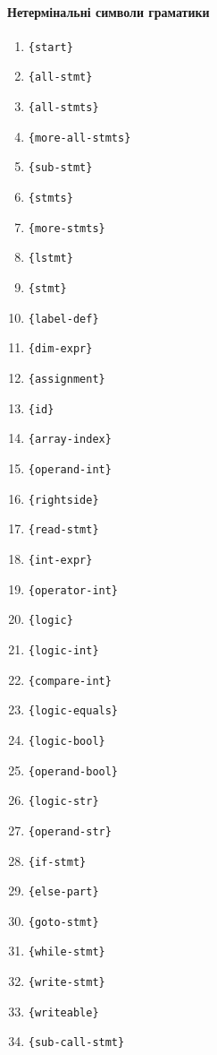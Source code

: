 \documentclass[a4paper,12pt,notitlepage,pdftex]{scrreprt}
\begin{document}
        \paragraph{Нетермінальні символи граматики}
        \label{para:nonterm}
        \begin{multicols}{3}
            \begin{enumerate}
                \item \verb'{start}'
                \item \verb'{all-stmt}'
                \item \verb'{all-stmts}'
                \item \verb'{more-all-stmts}'
                \item \verb'{sub-stmt}'
                \item \verb'{stmts}'
                \item \verb'{more-stmts}'
                \item \verb'{lstmt}'
                \item \verb'{stmt}'
                \item \verb'{label-def}'
                \item \verb'{dim-expr}'
                \item \verb'{assignment}'
                \item \verb'{id}'
                \item \verb'{array-index}'
                \item \verb'{operand-int}'
                \item \verb'{rightside}'
                \item \verb'{read-stmt}'
                \item \verb'{int-expr}'
                \item \verb'{operator-int}'
                \item \verb'{logic}'
                \item \verb'{logic-int}'
                \item \verb'{compare-int}'
                \item \verb'{logic-equals}'
                \item \verb'{logic-bool}'
                \item \verb'{operand-bool}'
                \item \verb'{logic-str}'
                \item \verb'{operand-str}'
                \item \verb'{if-stmt}'
                \item \verb'{else-part}'
                \item \verb'{goto-stmt}'
                \item \verb'{while-stmt}'
                \item \verb'{write-stmt}'
                \item \verb'{writeable}'
                \item \verb'{sub-call-stmt}'
            \end{enumerate}
        \end{multicols}
\end{document}
